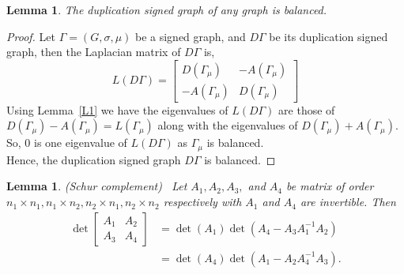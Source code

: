 \documentclass[12pt,a4paper]{article}
\newtheorem{lemma}[theorem]{Lemma}
\theoremstyle{definition}
\theoremstyle{remark}
\begin{document}
    \begin{lemma} \label{L3}
        The duplication signed graph of any graph is balanced.
    \end{lemma}
    \begin{proof}
        Let $\Gamma=(G,\sigma,\mu)$ be a signed graph, and $D\Gamma$ be its duplication signed graph, then the Laplacian matrix of $D\Gamma$ is,
        $$L(D\Gamma)=\begin{bmatrix}
            D(\Gamma_{\mu})& -A(\Gamma_{\mu})\\
            -A(\Gamma_{\mu})& D(\Gamma_{\mu})
        \end{bmatrix}$$
        Using Lemma~\ref{L1} we have the eigenvalues of $L(D\Gamma)$ are those of $D(\Gamma_{\mu})-A(\Gamma_{\mu})=L(\Gamma_{\mu})$ along with the eigenvalues of $D(\Gamma_{\mu})+A(\Gamma_{\mu})$.\\
        So, $0$ is one eigenvalue of $L(D\Gamma)$ as $\Gamma_{\mu}$ is balanced.\\
        Hence, the duplication signed graph $D\Gamma$ is balanced.
    \end{proof}

    \begin{lemma}(Schur complement)\label{L2}~\cite{bapat2010graphs}
        Let $A_1,A_2,A_3,$ and $A_4$ be matrix of order $n_1\times n_1, n_1\times n_2, n_2\times n_1, n_2\times n_2$ respectively with $A_1$ and $A_4$ are invertible. Then 
            \begin{align*}
                \det\begin{bmatrix}
                A_1&A_2\\A_3&A_4
        \end{bmatrix}&=\det(A_1)\det(A_4-A_3A_1^{-1}A_2)\\
        &=\det(A_4)\det(A_1-A_2A_4^{-1}A_3).
        \end{align*}
    \end{lemma}
    
\end{document}
